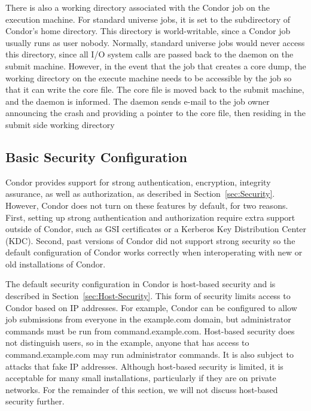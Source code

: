 There is also a working directory associated with the Condor job on
the execution machine.  For standard universe jobs, it is set to the
 subdirectory of Condor's home directory.  This
directory is world-writable, since a Condor job usually runs as user
nobody.  Normally, standard universe jobs would never access this
directory, since all I/O system calls are passed back to the
 daemon on the submit machine.  However, in the event
that the job that creates a core dump, the working directory on the
execute machine needs to be accessible by the job so that it can write
the core file.  The core file is moved back to the submit machine, and
the  daemon is informed.  The  daemon
sends e-mail to the job owner announcing the crash and providing a
pointer to the core file, then residing in the submit side working directory


\subsection{\label{sec:Config-Security}Basic Security Configuration}

Condor provides support for strong authentication, encryption,
integrity assurance, as well as authorization, as described in
Section~\ref{sec:Security}. However, Condor does not turn on these
features by default, for two reasons. First, setting up strong
authentication and authorization require extra support outside of
Condor, such as GSI certificates or a Kerberos Key Distribution Center
(KDC). Second, past versions of Condor did not support strong security
so the default configuration of Condor works correctly when
interoperating with new or old installations of Condor.

The default security configuration in Condor is host-based security
and is described in Section~\ref{sec:Host-Security}. This form of security
limits access to Condor based on IP addresses. For example, Condor can
be configured to allow job submissions from everyone in the
example.com domain, but administrator commands must be run from
command.example.com. Host-based security does not distinguish users,
so in the example, anyone that has access to command.example.com may
run administrator commands. It is also subject to attacks that fake IP
addresses. Although host-based security is limited, it is acceptable
for many small installations, particularly if they are on private
networks. For the remainder of this section, we will not discuss
host-based security further.

